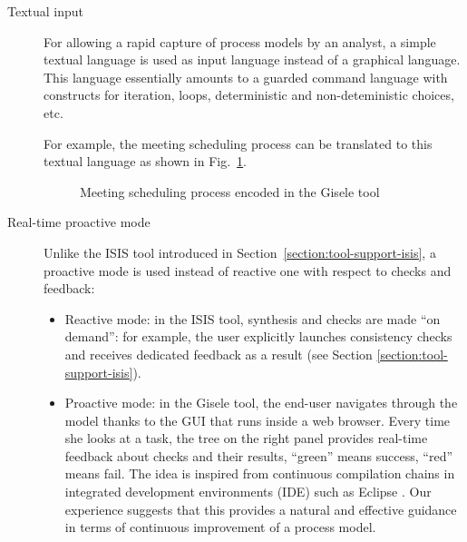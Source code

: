 \begin{description}
\item[Textual input] For allowing a rapid capture of process models by an analyst, a simple textual language is used as input language instead of a graphical language. This language essentially amounts to a guarded command language with constructs for iteration, loops, deterministic and non-deteministic choices, etc.

For example, the meeting scheduling process can be translated to this textual language as shown in Fig.~\ref{image:meeting-scheduling-gis}.

\begin{figure}[H]
\centering{}
  \caption{Meeting scheduling process encoded in the Gisele tool\label{image:meeting-scheduling-gis}}
\end{figure}

\item[Real-time proactive mode] Unlike the ISIS tool introduced in Section~\ref{section:tool-support-isis}, a proactive mode is used instead of reactive one with respect to checks and feedback:
\begin{itemize}
\item Reactive mode: in the ISIS tool, synthesis and checks are made ``on demand'': for example, the user explicitly launches consistency checks and receives dedicated feedback as a result (see Section \ref{section:tool-support-isis}).
\item Proactive mode: in the Gisele tool, the end-user navigates through the model thanks to the GUI that runs inside a web browser. Every time she looks at a task, the tree on the right panel provides real-time feedback about checks and their results, ``green'' means success, ``red'' means fail. The idea is inspired from continuous compilation chains in integrated development environments (IDE) such as Eclipse \cite{XXX}. Our experience suggests that this provides a natural and effective guidance in terms of continuous improvement of a process model. 

\end{itemize} 
\end{description}

